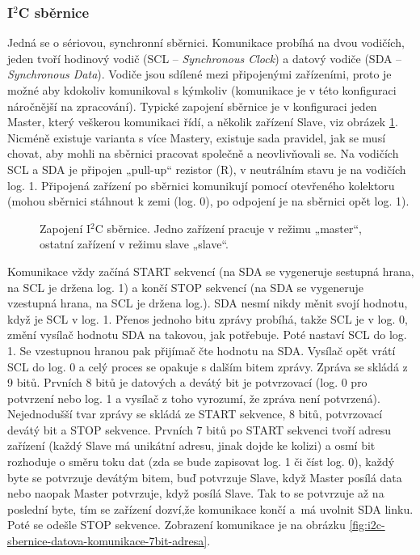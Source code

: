 \subsubsection{I$^2$C sběrnice}
Jedná se o sériovou, synchronní sběrnici. Komunikace probíhá na dvou vodičích, jeden tvoří hodinový vodič (SCL – \textit{Synchronous Clock}) a datový vodiče (SDA – \textit{Synchronous Data}). Vodiče jsou sdílené mezi připojenými zařízeními, proto je možné aby kdokoliv komunikoval s kýmkoliv (komunikace je v této konfiguraci náročnější na zpracování). Typické zapojení sběrnice je v konfiguraci jeden Master, který veškerou komunikaci řídí, a několik zařízení Slave, viz obrázek \ref{fig:i2c-sbernice}. Nicméně existuje varianta s více Mastery, existuje sada pravidel, jak se musí chovat, aby mohli na sběrnici pracovat společně a neovlivňovali se. Na vodičích SCL a SDA je připojen „pull-up“ rezistor (R), v neutrálním stavu je na vodičích log. 1. Připojená zařízení po sběrnici komunikují pomocí otevřeného kolektoru (mohou sběrnici stáhnout k zemi (log. 0), po odpojení je na sběrnici opět log. 1).

\begin{figure}[H]
    \centering
    \def\svgwidth{\columnwidth}
    
    \caption{Zapojení I$^2$C sběrnice. Jedno zařízení pracuje v režimu „master“, ostatní zařízení v režimu slave „slave“.}
    \label{fig:i2c-sbernice}
\end{figure}

Komunikace vždy začíná START sekvencí (na SDA se vygeneruje sestupná hrana, na SCL je držena log. 1) a končí STOP sekvencí (na SDA se vygeneruje vzestupná hrana, na SCL je držena log.). SDA nesmí nikdy měnit svojí hodnotu, když je SCL v log. 1.  Přenos jednoho bitu zprávy probíhá, takže SCL je v log. 0, změní vysílač hodnotu SDA na takovou, jak potřebuje. Poté nastaví SCL do log. 1. Se vzestupnou hranou pak přijímač čte hodnotu na SDA. Vysílač opět vrátí SCL do log. 0 a celý proces se opakuje s dalším bitem zprávy. Zpráva se skládá z 9 bitů. Prvních 8 bitů je datových a devátý bit je potvrzovací (log. 0 pro potvrzení nebo log. 1 a vysílač z toho vyrozumí, že zpráva není potvrzená). Nejednodušší tvar zprávy se skládá ze START sekvence, 8 bitů, potvrzovací devátý bit a STOP sekvence. Prvních 7 bitů po START sekvenci tvoří adresu zařízení (každý Slave má unikátní adresu, jinak dojde ke kolizi) a osmí bit rozhoduje o směru toku dat (zda se bude zapisovat log. 1 či číst log. 0), každý byte se potvrzuje devátým bitem, buď potvrzuje Slave, když Master posílá data nebo naopak Master potvrzuje, když posílá Slave. Tak to se potvrzuje až na poslední byte, tím se zařízení dozví,že komunikace končí a~má uvolnit SDA linku. Poté se odešle STOP sekvence. Zobrazení komunikace je na obrázku \ref{fig:i2c-sbernice-datova-komunikace-7bit-adresa}.

